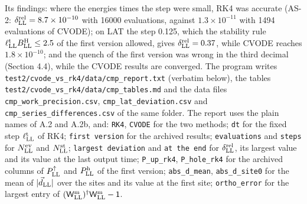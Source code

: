 \documentclass[
  10pt,
]{article}
\begin{document}
Its findings: where the energies times the step were small, RK4 was
accurate (AS-2: \(\delta^{\rm rel}_{\rm LL}=8.7\times10^{-10}\) with
16000 evaluations, against \(1.3\times10^{-11}\) with 1494 evaluations
of CVODE); on LAT the step 0.125, which the stability rule
\(\ell^{\rm t}_{\rm LL}B^{\rm H}_{\rm LL}\le2.5\) of the first version
allowed, gives \(\delta^{\rm rel}_{\rm LL}=0.37\), while CVODE reaches
\(1.8\times10^{-10}\); and the quench of the first version was wrong in
the third decimal (Section 4.4), while the CVODE results are converged.
The program writes \texttt{test2/cvode\_vs\_rk4/data/cmp\_report.txt}
(verbatim below), the tables
\texttt{test2/cvode\_vs\_rk4/data/cmp\_tables.md} and the data files
\texttt{cmp\_work\_precision.csv}, \texttt{cmp\_lat\_deviation.csv} and
\texttt{cmp\_series\_differences.csv} of the same folder. The report
uses the plain names of A.2 and A.2b, and: \texttt{RK4}, \texttt{CVODE}
for the two methods; \texttt{dt} for the fixed step
\(\ell^{\rm t}_{\rm LL}\) of RK4; \texttt{first\ version} for the
archived results; \texttt{evaluations} and \texttt{steps} for
\(N^{\rm ev}_{\rm LL}\) and \(N^{\rm st}_{\rm LL}\);
\texttt{largest\ deviation} and \texttt{at\ the\ end} for
\(\delta^{\rm rel}_{\rm LL}\), its largest value and its value at the
last output time; \texttt{P\_up\_rk4}, \texttt{P\_hole\_rk4} for the
archived columns of \(P^\uparrow_{\rm LL}\) and \(P^{\rm h}_{\rm LL}\)
of the first version; \texttt{abs\_d\_mean}, \texttt{abs\_d\_site0} for
the mean of \(\lvert\vec d_{\rm LL}\rvert\) over the sites and its value
at the first site; \texttt{ortho\_error} for the largest entry of
\((\mathsf W^{\rm m}_{\rm LL})^\dagger\mathsf W^{\rm m}_{\rm LL}-\mathsf 1\).
\end{document}
